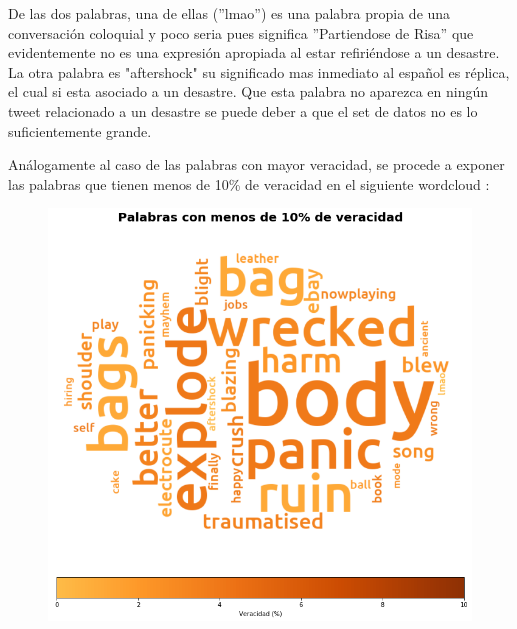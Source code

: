 \documentclass[titlepage,a4paper]{article}
\begin{document}
    De las dos palabras, una de ellas (”lmao”) es una palabra propia de una conversación  coloquial y poco seria pues significa ”Partiendose de Risa” que evidentemente no es una expresión apropiada al estar refiriéndose a un desastre.
    La otra palabra es "aftershock" su significado mas inmediato al español es réplica, el cual si esta asociado a un desastre. Que esta palabra no aparezca en ningún tweet relacionado a un desastre se puede deber a que el set de datos no es lo suficientemente grande.
    
    Análogamente al caso de las palabras con mayor veracidad, se procede a exponer las palabras que tienen menos de 10\% de veracidad en el   siguiente wordcloud :
    
     \begin{figure}[H]
    \centering
    \includegraphics[width=1\textwidth]{graficos/Analisis Lexico Grafico/palabras_con_menos_de_10_de_veracidad.png}
    \caption{} 
    \end{figure}
    
    
    
\end{document}
